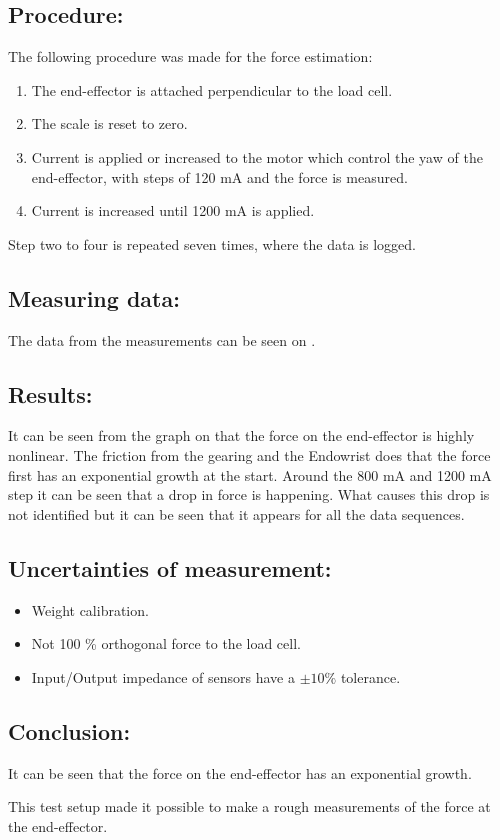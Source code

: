 \subsection*{Procedure:}
The following procedure was made for the force estimation:
\begin{enumerate}
\item The end-effector is attached perpendicular to the load cell. 
\item The scale is reset to zero.
\item Current is applied or increased to the motor which control the yaw of the end-effector, with steps of 120 mA and the force is measured.
\item Current is increased until 1200 mA is applied.
\end{enumerate}
Step two to four is repeated seven times, where the data is logged. 


\subsection*{Measuring data:}
The data from the measurements can be seen on . 




\subsection*{Results:}
It can be seen from the graph on  that the force on the end-effector is highly nonlinear. The friction from the gearing and the Endowrist does that the force first has an exponential growth at the start. Around the 800 mA and 1200 mA step it can be seen that a drop in force is happening. What causes this drop is not identified but it can be seen that it appears for all the data sequences. 




\subsection*{Uncertainties of measurement:}
\begin{itemize}
\item Weight calibration.
\item Not 100 \% orthogonal force to the load cell.
\item Input/Output impedance of sensors have a $\pm 10 \%$ tolerance.
\end{itemize}

\subsection*{Conclusion:}
It can be seen that the force on the end-effector has an exponential growth.

This test setup made it possible to make a rough measurements of the force at the end-effector.

